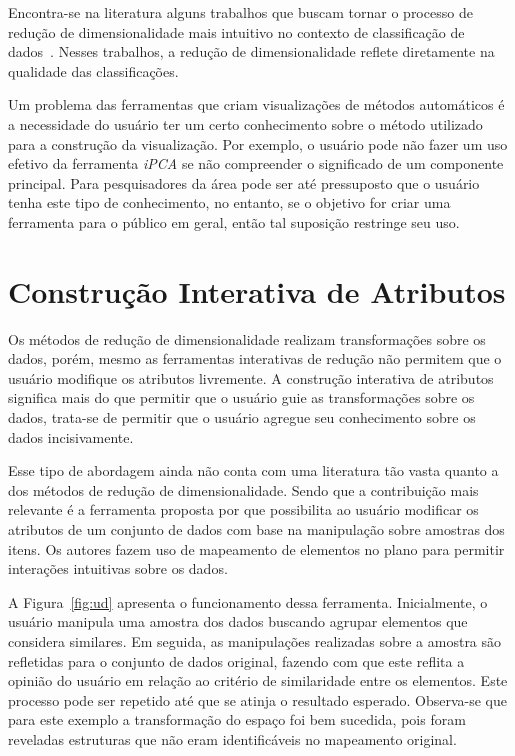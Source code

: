 Encontra-se na literatura alguns trabalhos que buscam tornar o
processo de redução de dimensionalidade mais intuitivo no
contexto de classificação de dados~\citet{Zhang2006,
Choo2010, Paiva2012}. Nesses trabalhos, a redução
de dimensionalidade reflete diretamente na qualidade das
classificações. 

Um problema das ferramentas que criam visualizações de
métodos automáticos é a necessidade do usuário ter um certo
conhecimento sobre o método utilizado para a construção da
visualização. Por exemplo, o usuário pode não fazer um uso
efetivo da ferramenta \emph{iPCA} se não compreender o significado
de  um componente principal.  Para pesquisadores da área
pode ser até pressuposto que o usuário tenha este tipo de
conhecimento, no entanto, se o objetivo for criar uma
ferramenta para o público em geral, então tal suposição 
restringe seu uso.

\section{Construção Interativa de Atributos}\label{sec:tr}

Os métodos de redução de dimensionalidade realizam
transformações sobre os dados, porém, mesmo as ferramentas
interativas de redução não permitem que o usuário modifique
os atributos livremente. A construção interativa de
atributos significa mais do que permitir que o usuário guie
as transformações sobre os dados, trata-se de permitir que o
usuário agregue seu conhecimento sobre os dados
incisivamente.

Esse tipo de abordagem ainda não conta com uma literatura
tão vasta quanto a dos métodos de redução de
dimensionalidade. Sendo que a contribuição mais relevante é a
ferramenta proposta por \citet{Gladys2013} que possibilita ao
usuário modificar os atributos de um conjunto de dados com
base na manipulação sobre amostras dos itens. Os autores
fazem uso de mapeamento de elementos no plano para permitir
interações intuitivas sobre os dados. 

A Figura~\ref{fig:ud} apresenta  o funcionamento dessa
ferramenta. Inicialmente, o usuário manipula uma amostra dos
dados buscando  agrupar elementos que considera similares.
Em seguida, as manipulações realizadas sobre a amostra são
refletidas para o conjunto de dados original, fazendo com
que este reflita a opinião do usuário em relação ao critério
de similaridade entre os elementos. Este processo pode ser
repetido até que se atinja o resultado esperado.  Observa-se
que para este exemplo a transformação do espaço foi bem
sucedida, pois foram reveladas estruturas que não
eram identificáveis no mapeamento original.

